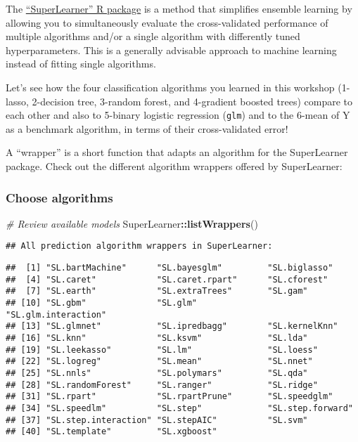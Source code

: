 \documentclass[
]{book}
\newenvironment{Shaded}{\begin{snugshade}}{\end{snugshade}}
\newcommand{\CommentTok}[1]{\textcolor[rgb]{0.56,0.35,0.01}{\textit{#1}}}
\newcommand{\KeywordTok}[1]{\textcolor[rgb]{0.13,0.29,0.53}{\textbf{#1}}}
\newcommand{\NormalTok}[1]{#1}
\newcommand{\OperatorTok}[1]{\textcolor[rgb]{0.81,0.36,0.00}{\textbf{#1}}}
\begin{document}
The \href{https://cran.r-project.org/web/packages/SuperLearner/index.html}{``SuperLearner'' R package} is a method that simplifies ensemble learning by allowing you to simultaneously evaluate the cross-validated performance of multiple algorithms and/or a single algorithm with differently tuned hyperparameters. This is a generally advisable approach to machine learning instead of fitting single algorithms.

Let's see how the four classification algorithms you learned in this workshop (1-lasso, 2-decision tree, 3-random forest, and 4-gradient boosted trees) compare to each other and also to 5-binary logistic regression (\texttt{glm}) and to the 6-mean of Y as a benchmark algorithm, in terms of their cross-validated error!

A ``wrapper'' is a short function that adapts an algorithm for the SuperLearner package. Check out the different algorithm wrappers offered by SuperLearner:

\hypertarget{choose-algorithms}{%
\subsubsection{Choose algorithms}\label{choose-algorithms}}

\begin{Shaded}
\begin{Highlighting}[]
\CommentTok{\# Review available models }
\NormalTok{SuperLearner}\OperatorTok{::}\KeywordTok{listWrappers}\NormalTok{()}
\end{Highlighting}
\end{Shaded}

\begin{verbatim}
## All prediction algorithm wrappers in SuperLearner:
\end{verbatim}

\begin{verbatim}
##  [1] "SL.bartMachine"      "SL.bayesglm"         "SL.biglasso"        
##  [4] "SL.caret"            "SL.caret.rpart"      "SL.cforest"         
##  [7] "SL.earth"            "SL.extraTrees"       "SL.gam"             
## [10] "SL.gbm"              "SL.glm"              "SL.glm.interaction" 
## [13] "SL.glmnet"           "SL.ipredbagg"        "SL.kernelKnn"       
## [16] "SL.knn"              "SL.ksvm"             "SL.lda"             
## [19] "SL.leekasso"         "SL.lm"               "SL.loess"           
## [22] "SL.logreg"           "SL.mean"             "SL.nnet"            
## [25] "SL.nnls"             "SL.polymars"         "SL.qda"             
## [28] "SL.randomForest"     "SL.ranger"           "SL.ridge"           
## [31] "SL.rpart"            "SL.rpartPrune"       "SL.speedglm"        
## [34] "SL.speedlm"          "SL.step"             "SL.step.forward"    
## [37] "SL.step.interaction" "SL.stepAIC"          "SL.svm"             
## [40] "SL.template"         "SL.xgboost"
\end{verbatim}
\end{document}
